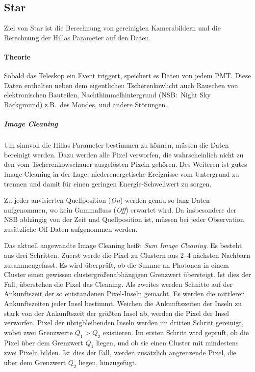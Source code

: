 \subsection{Star}%
\label{sub:star}
Ziel von Star ist die Berechnung von gereinigten Kamerabildern und die Berechnung
der Hillas Parameter auf den Daten.

\paragraph{Theorie}
Sobald das Teleskop ein Event triggert,
speichert es Daten von jedem PMT.\@
Diese Daten enthalten neben dem eigentlichen Tscherenkowlicht auch
Rauschen von elektronischen Bauteilen,
Nachthimmelhintergrund (NSB:\ Night Sky Background) z.B.\ des Mondes,
und andere Störungen.

\subparagraph{Image Cleaning}
Um sinnvoll die Hillas Parameter bestimmen zu können,
müssen die Daten bereinigt werden.
Dazu werden alle Pixel verworfen, die wahrscheinlich nicht zu den
vom Tscherenkowschauer ausgelösten Pixeln gehören.
Des Weiteren ist gutes Image Cleaning in der Lage,
niederenergetische Ereignisse vom Untergrund zu trennen und damit
für einen geringen Energie-Schwellwert zu sorgen.

Zu jeder anvisierten Quellposition (\textit{On}) werden
genau so lang Daten aufgenommen,
wo kein Gammafluss (\textit{Off}) erwartet wird.
Da insbesondere der NSB abhängig von der Zeit und Quellposition ist,
müssen bei jeder Observation zusätzliche Off-Daten aufgenommen werden.

Das aktuell angewandte Image Cleaning heißt \textit{Sum Image Cleaning}.
Es besteht aus drei Schritten.
Zuerst werde die Pixel zu Clustern aus 2--4 nächsten Nachbarn zusammengefasst.
Es wird überprüft, ob die Summe an Photonen in einem Cluster
einen gewissen clustergrößenabhängigen Grenzwert übersteigt.
Ist dies der Fall, überstehen die Pixel das Cleaning.
Als zweites werden Schnitte auf der Ankunftszeit der so entstandenen
Pixel-Inseln gemacht.
Es werden die mittleren Ankunftszeiten jeder Insel bestimmt.
Weichen die Ankunftszeiten der Inseln zu stark von der Ankunftszeit der größten Insel ab,
werden die Pixel der Insel verworfen.
Pixel der übrigbleibenden Inseln werden im dritten Schritt gereinigt,
wobei zwei Grenzwerte $Q_{1} > Q_{2}$ existieren.
Im ersten Schritt wird geprüft,
ob die Pixel über dem
Grenzwert $Q_{1}$ liegen,
und ob sie einen Cluster mit mindestens zwei Pixeln bilden.
Ist dies der Fall,
werden zusätzlich angrenzende Pixel,
die über dem Grenzwert $Q_{2}$ liegen,
hinzugefügt.

